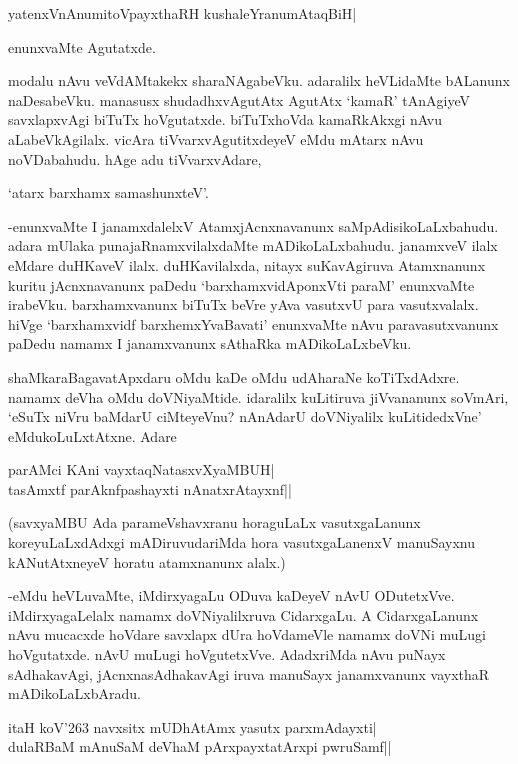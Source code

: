 \begin{shloka}
yatenxVnAnumitoVpayxthaRH kushaleYranumAtaqBiH|
\end{shloka}

enunxvaMte Agutatxde.

modalu nAvu veVdAMtakekx sharaNAgabeVku. adaralilx heVLidaMte bALanunx naDesabeVku. manasusx shudadhxvAgutAtx AgutAtx `kamaR' tAnAgiyeV savxlapxvAgi biTuTx hoVgutatxde. biTuTxhoVda kamaRkAkxgi nAvu aLabeVkAgilalx. vicAra tiVvarxvAgutitxdeyeV eMdu mAtarx nAvu noVDabahudu. hAge adu tiVvarxvAdare,

\begin{shloka}
`atarx barxhamx samashunxteV'.
\end{shloka}

-enunxvaMte I janamxdalelxV AtamxjAcnxnavanunx saMpAdisikoLaLxbahudu. adara mUlaka punajaRnamxvilalxdaMte mADikoLaLxbahudu. janamxveV ilalx eMdare duHKaveV ilalx. duHKavilalxda, nitayx suKavAgiruva Atamxnanunx kuritu jAcnxnavanunx paDedu `barxhamxvidAponxVti paraM' enunxvaMte irabeVku. barxhamxvanunx biTuTx beVre yAva vasutxvU para vasutxvalalx. hiVge `barxhamxvidf barxhemxYvaBavati' enunxvaMte nAvu paravasutxvanunx paDedu namamx I janamxvanunx sAthaRka mADikoLaLxbeVku.

shaMkaraBagavatApxdaru oMdu kaDe oMdu udAharaNe koTiTxdAdxre. namamx deVha oMdu doVNiyaMtide. idaralilx kuLitiruva jiVvananunx soVmAri, `eSuTx niVru baMdarU ciMteyeVnu? nAnAdarU doVNiyalilx kuLitidedxVne' eMdukoLuLxtAtxne. Adare

\begin{shloka}
parAMci KAni vayxtaqNatasxvXyaMBUH|\\
tasAmxtf parAknfpashayxti nAnatxrAtayxnf||
\end{shloka}

(savxyaMBU Ada parameVshavxranu horaguLaLx vasutxgaLanunx koreyuLaLxdAdxgi mADiruvudariMda hora vasutxgaLanenxV manuSayxnu kANutAtxneyeV horatu atamxnanunx alalx.)

-eMdu heVLuvaMte, iMdirxyagaLu ODuva kaDeyeV nAvU ODutetxVve. iMdirxyagaLelalx namamx doVNiyalilxruva CidarxgaLu. A CidarxgaLanunx nAvu mucacxde hoVdare savxlapx dUra hoVdameVle namamx doVNi muLugi hoVgutatxde. nAvU muLugi hoVgutetxVve. AdadxriMda nAvu puNayx sAdhakavAgi, jAcnxnasAdhakavAgi iruva manuSayx janamxvanunx vayxthaR mADikoLaLxbAradu.

\begin{shloka}
itaH koV\char'263 navxsitx mUDhAtAmx yasutx parxmAdayxti|\\
dulaRBaM mAnuSaM deVhaM pArxpayxtatArxpi pwruSamf||
\end{shloka}

